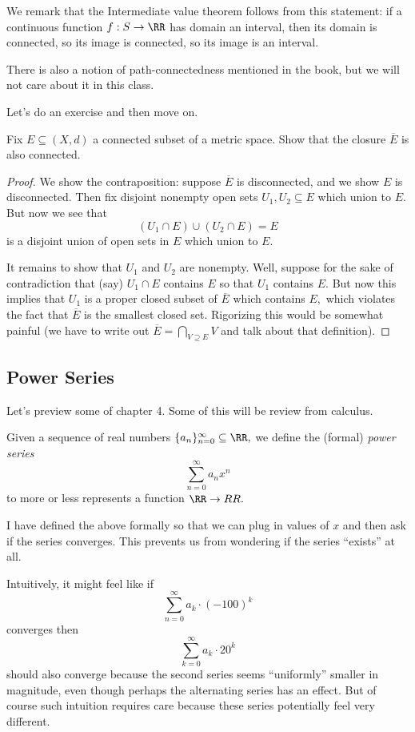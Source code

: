 We remark that the Intermediate value theorem follows from this statement: if a continuous function $f:S\to\RR$ has domain an interval, then its domain is connected, so its image is connected, so its image is an interval.
\begin{remark}
	There is also a notion of path-connectedness mentioned in the book, but we will not care about it in this class.
\end{remark}
Let's do an exercise and then move on.
\begin{exercise}[Ross 22.3]
	Fix $E\subseteq(X,d)$ a connected subset of a metric space. Show that the closure $\overline E$ is also connected.
\end{exercise}
\begin{proof}
	We show the contraposition: suppose $\overline E$ is disconnected, and we show $E$ is disconnected. Then fix disjoint nonempty open sets $U_1,U_2\subseteq E$ which union to $E.$ But now we see that
	\[(U_1\cap E)\cup(U_2\cap E)=E\]
	is a disjoint union of open sets in $E$ which union to $E.$

	It remains to show that $U_1$ and $U_2$ are nonempty. Well, suppose for the sake of contradiction that (say) $U_1\cap E$ contains $E$ so that $U_1$ contains $E.$ But now this implies that $U_1$ is a proper closed subset of $\overline E$ which contains $E,$ which violates the fact that $\overline E$ is the smallest closed set. Rigorizing this would be somewhat painful (we have to write out $\overline E=\bigcap_{V\supseteq E}V$ and talk about that definition).
\end{proof}

\subsection{Power Series}
Let's preview some of chapter 4. Some of this will be review from calculus.
\begin{definition}
	Given a sequence of real numbers $\{a_n\}_{n=0}^\infty\subseteq\RR,$ we define the (formal) \textit{power series}
	\[\sum_{n=0}^\infty a_nx^n\]
	to more or less represents a function $\RR\to\\RR.$
\end{definition}
\begin{remark}
	I have defined the above formally so that we can plug in values of $x$ and then ask if the series converges. This prevents us from wondering if the series ``exists'' at all.
\end{remark}
Intuitively, it might feel like if
\[\sum_{n=0}^\infty a_k\cdot(-100)^k\]
converges then
\[\sum_{k=0}^\infty a_k\cdot20^k\]
should also converge because the second series seems ``uniformly'' smaller in magnitude, even though perhaps the alternating series has an effect. But of course such intuition requires care because these series potentially feel very different.

